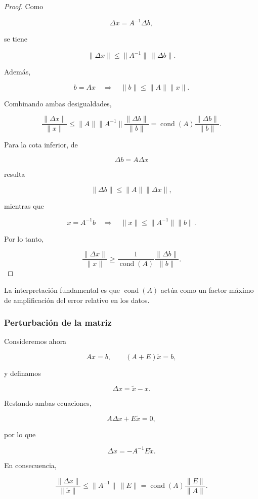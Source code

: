 \documentclass[12pt]{article}
\DeclareMathOperator{\cond}{cond}
\begin{document}
\begin{proof}
Como

\[
    \Delta x=A^{-1}\Delta b,
\]

se tiene

\[
    \|\Delta x\|
    \leq
    \|A^{-1}\|\,\|\Delta b\|.
\]

Además,

\[
    b=Ax
    \quad\Longrightarrow\quad
    \|b\|\leq\|A\|\|x\|.
\]

Combinando ambas desigualdades,

\[
    \frac{\|\Delta x\|}{\|x\|}
    \leq
    \|A\|\|A^{-1}\|
    \frac{\|\Delta b\|}{\|b\|}
    =
    \cond(A)
    \frac{\|\Delta b\|}{\|b\|}.
\]

Para la cota inferior, de

\[
    \Delta b=A\Delta x
\]

resulta

\[
    \|\Delta b\|
    \leq
    \|A\|\|\Delta x\|,
\]

mientras que

\[
    x=A^{-1}b
    \quad\Longrightarrow\quad
    \|x\|\leq\|A^{-1}\|\|b\|.
\]

Por lo tanto,

\[
    \frac{\|\Delta x\|}{\|x\|}
    \geq
    \frac{1}{\cond(A)}
    \frac{\|\Delta b\|}{\|b\|}.
\]
\end{proof}

La interpretación fundamental es que $\cond(A)$ actúa como un factor
máximo de amplificación del error relativo en los datos.


\subsubsection*{Perturbación de la matriz}

Consideremos ahora

\[
    Ax=b,
    \qquad
    (A+E)\widetilde{x}=b,
\]

y definamos

\[
    \Delta x=\widetilde{x}-x.
\]

Restando ambas ecuaciones,

\[
    A\Delta x+E\widetilde{x}=0,
\]

por lo que

\[
    \Delta x=-A^{-1}E\widetilde{x}.
\]

En consecuencia,

\[
    \boxed{
    \frac{\|\Delta x\|}
         {\|\widetilde{x}\|}
    \leq
    \|A^{-1}\|\,\|E\|
    =
    \cond(A)
    \frac{\|E\|}{\|A\|}.
    }
\]
\end{document}
